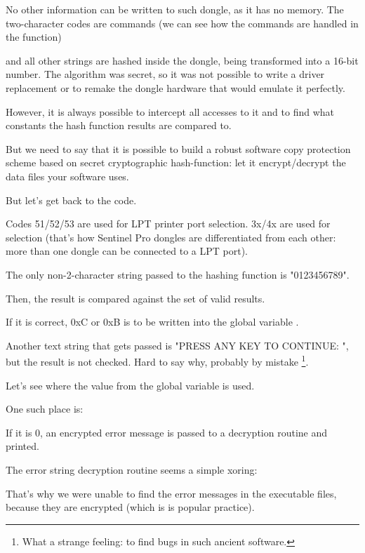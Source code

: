 No other information can be written to such dongle, as it has no memory.
The two-character codes are commands
(we can see how the commands are handled in the 
 function) 

and all other strings are hashed inside the dongle, being transformed into a 16-bit number.
The algorithm was secret,
so it was not possible to write a driver replacement or to remake the dongle hardware that would emulate it perfectly.

However, it is always possible to intercept all accesses to it and to find what constants
the hash function results are compared to.

But we need to say that it is possible to build a robust software copy protection scheme based on secret
cryptographic hash-function: let it encrypt/decrypt the data files your software uses.

But let's get back to the code.

Codes 51/52/53 
are used for LPT printer port selection.
3x/4x are used for  
selection (that's how Sentinel Pro dongles are differentiated from each other: more than one
dongle can be connected to a LPT port).

The only non-2-character string passed to the hashing function is "0123456789".

Then, the result is compared against the set of valid results.

If it is correct, 0xC or 0xB is to be written into the global variable .%

Another text string that gets passed is
"PRESS ANY KEY TO CONTINUE: ", but the result is not checked.
Hard to say why, probably by mistake
\footnote{What a strange feeling: to find bugs in such ancient software.}.

Let's see where the value from the global variable  is used.

One such place is:



If it is 0, an encrypted error message is passed to a decryption routine and printed.


The error string decryption routine seems a simple \gls{xoring}:



%
That's why we were unable to find the error messages in the executable files, because they are encrypted
(which is is popular practice).

